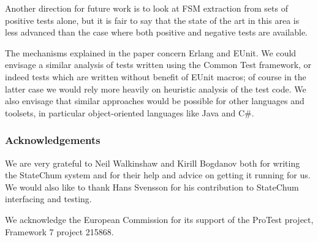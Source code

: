 \documentclass[]{sigplanconf}
\begin{document}
Another direction for future work is to look at FSM extraction from sets of positive tests alone, but it is fair to say that the state of the art in this area is less advanced than the case where both positive and negative tests are available.

The mechanisms explained in the paper concern Erlang and EUnit. We could envisage a similar analysis of tests written using the Common Test framework, or indeed tests which are written without benefit of EUnit macros; of course in the latter case we would rely more heavily on heuristic analysis of the test code. We also envisage that similar approaches would be possible for other languages and toolsets, in particular object-oriented languages like Java and C\#.


\subsubsection*{Acknowledgements}
We are very grateful to Neil Walkinshaw and Kirill Bogdanov both for writing the StateChum system and for their help and advice on getting it running for us. We would also like to thank Hans Svensson for his contribution to StateChum interfacing and testing. 

We acknowledge the European Commission for its support of the ProTest project, Framework 7 project 215868. 




\end{document}

